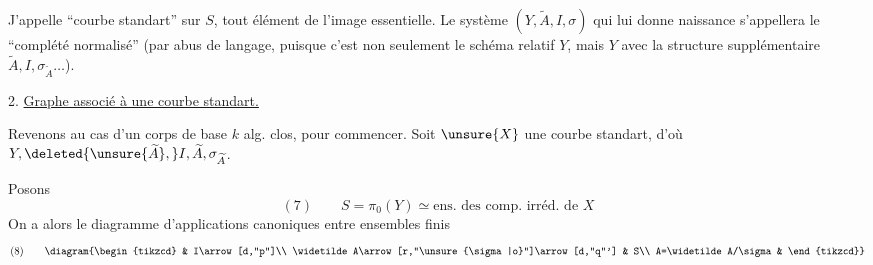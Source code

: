 J'appelle ``courbe  standart'' sur $S$, tout élément de l'image essentielle. Le système $(Y,\widetilde A,I,\sigma)$ qui lui donne naissance s'appellera le ``complété normalisé''  (par abus de  langage, puisque c'est non seulement le schéma relatif $Y$, mais $Y$ avec la structure supplémentaire $\widetilde A,I,\sigma_{\widetilde A}\ldots$).

2. \uline{Graphe associé à une courbe standart.}

Revenons au cas d'un corps de base $k$ alg. clos, pour commencer. Soit $\unsure{X}$ une courbe standart, d'où $Y,\deleted{\unsure{\widetilde A},}I,\widetilde A,\sigma_{\widetilde A}$.

Posons
\[
(7)\qquad S=\pi_0(Y)\simeq\text{ens. des comp. irréd. de }X
\]
On a alors le diagramme d'applications canoniques entre ensembles finis
\[
(8)\qquad
\diagram{\begin{tikzcd}
& I\arrow[d,"p"]\\
\widetilde A\arrow[r,"\unsure{\sigma|o}"]\arrow[d,"q"'] & S\\
A=\widetilde A/\sigma &
\end{tikzcd}}
\]
